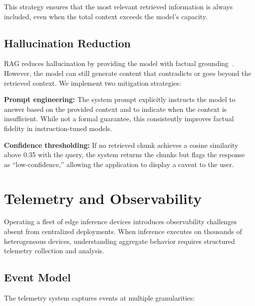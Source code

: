 \documentclass[12pt, letterpaper, twoside]{report}
\begin{document}
This strategy ensures that the most relevant retrieved information is always included, even when the total context exceeds the model's capacity.

\section{Hallucination Reduction}
\label{sec:hallucination}

RAG reduces hallucination by providing the model with factual grounding~\cite{shuster2021retrieval}. However, the model can still generate content that contradicts or goes beyond the retrieved context. We implement two mitigation strategies:

\textbf{Prompt engineering:} The system prompt explicitly instructs the model to answer based on the provided context and to indicate when the context is insufficient. While not a formal guarantee, this consistently improves factual fidelity in instruction-tuned models.

\textbf{Confidence thresholding:} If no retrieved chunk achieves a cosine similarity above 0.35 with the query, the system returns the chunks but flags the response as ``low-confidence,'' allowing the application to display a caveat to the user.

\chapter{Telemetry and Observability}
\label{ch:telemetry}

Operating a fleet of edge inference devices introduces observability challenges absent from centralized deployments. When inference executes on thousands of heterogeneous devices, understanding aggregate behavior requires structured telemetry collection and analysis.

\section{Event Model}
\label{sec:event_model}

The telemetry system captures events at multiple granularities:
\end{document}
